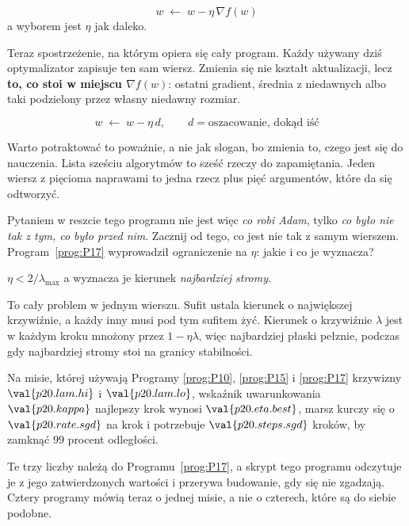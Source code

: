 \begin{fr}
\begin{ansblock}
\[ w \;\leftarrow\; w - \eta\,\nabla f(w) \]
a wyborem jest $\eta$ \dash{} jak daleko.
\end{ansblock}

Teraz spostrzeżenie, na którym opiera się cały program. Każdy używany dziś
optymalizator zapisuje ten sam wiersz. Zmienia się nie kształt aktualizacji,
lecz \textbf{to, co stoi w miejscu $\nabla f(w)$}: ostatni gradient, średnia z
niedawnych albo taki podzielony przez własny niedawny rozmiar.

\[ w \;\leftarrow\; w - \eta\,d, \qquad d = \text{oszacowanie, dokąd iść} \]

\end{fr}

\begin{fr}
Warto potraktować to poważnie, a nie jak slogan, bo zmienia to, czego jest się
do nauczenia. Lista sześciu algorytmów to sześć rzeczy do zapamiętania. Jeden
wiersz z pięcioma naprawami to jedna rzecz plus pięć argumentów, które da się
odtworzyć.

Pytaniem w reszcie tego programu nie jest więc \emph{co robi Adam}, tylko
\emph{co było nie tak z tym, co było przed nim}. Zacznij od tego, co jest nie
tak z samym wierszem. Program~\ref{prog:P17} wyprowadził ograniczenie na
$\eta$: jakie i co je wyznacza?
\dotline
\nextframe
\end{fr}

\begin{fr}
\begin{ansblock}
$\eta < 2/\lambda_{\max}$ \dash{} a wyznacza je kierunek \emph{najbardziej
stromy}.
\end{ansblock}

To cały problem w jednym wierszu. Sufit ustala kierunek o największej
krzywiźnie, a każdy inny musi pod tym sufitem żyć. Kierunek o krzywiźnie
$\lambda$ jest w każdym kroku mnożony przez $1 - \eta\lambda$, więc najbardziej
płaski pełznie, podczas gdy najbardziej stromy stoi na granicy stabilności.

Na misie, której używają Programy \ref{prog:P10}, \ref{prog:P15} i
\ref{prog:P17} \dash{} krzywizny $\val{p20.lam.hi}$ i $\val{p20.lam.lo}$,
wskaźnik uwarunkowania $\val{p20.kappa}$ \dash{} najlepszy krok wynosi
$\val{p20.eta.best}$, marsz kurczy się o $\val{p20.rate.sgd}$ na krok i
potrzebuje $\val{p20.steps.sgd}$ kroków, by zamknąć $99$ procent odległości.

\begin{note}
Te trzy liczby należą do Programu~\ref{prog:P17}, a skrypt tego programu
odczytuje je z jego zatwierdzonych wartości i przerywa budowanie, gdy się nie
zgadzają. Cztery programy mówią teraz o jednej misie, a nie o czterech, które
są do siebie podobne.
\end{note}
\end{fr}

